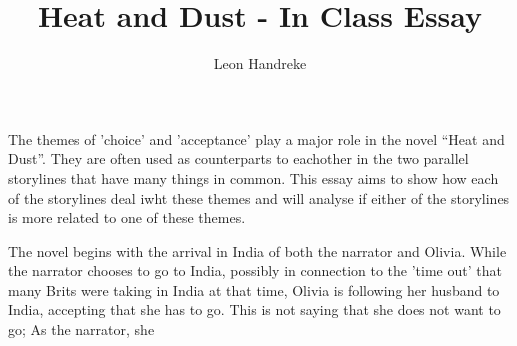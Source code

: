 \documentclass[11pt]{article}
\title{Heat and Dust - In Class Essay}
\author{Leon Handreke}
\date{}                                           %
\begin{document}
\doublespacing

\maketitle
{}\selectfont

The themes of 'choice' and 'acceptance' play a major role in the novel ``Heat and Dust''. They are often used as counterparts to eachother in the two parallel storylines that have many things in common. This essay aims to show how each of the storylines deal iwht these themes and will analyse if either of the storylines is more related to one of these themes.

The novel begins with the arrival in India of both the narrator and Olivia. While the narrator chooses to go to India, possibly in connection to the 'time out' that many Brits were taking in India at that time, Olivia is following her husband to India, accepting that she has to go. This is not saying that she does not want to go; As the narrator, she 
\end{document}

